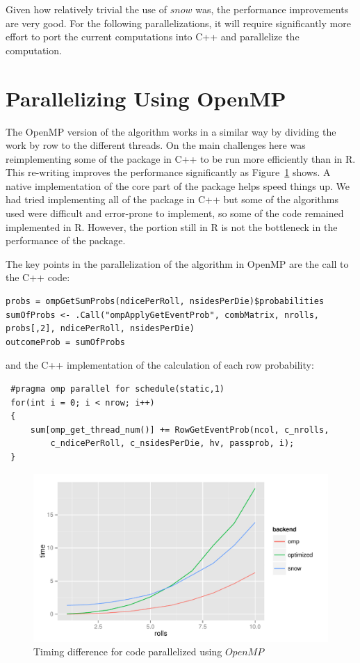 \documentclass[12pt]{article}
\begin{document}
Given how relatively trivial the use of $snow$ was, the performance improvements are very good. For the following parallelizations, it will require significantly more effort to port the current computations into C++ and parallelize the computation.

\section{Parallelizing Using OpenMP}

The OpenMP version of the algorithm works in a similar way by dividing the work by row to the different threads. On the main challenges here was reimplementing some of the package in C++ to be run more efficiently than in R. This re-writing improves the performance significantly as Figure~\ref{ompComparison} shows. A native implementation of the core part of the package helps speed things up. We had tried implementing all of the package in C++ but some of the algorithms used were difficult and error-prone to implement, so some of the code remained implemented in R. However, the portion still in R is not the bottleneck in the performance of the package.

The key points in the parallelization of the algorithm in OpenMP are the call to the C++ code:

\begin{lstlisting}
probs = ompGetSumProbs(ndicePerRoll, nsidesPerDie)$probabilities
sumOfProbs <- .Call("ompApplyGetEventProb", combMatrix, nrolls, probs[,2], ndicePerRoll, nsidesPerDie)
outcomeProb = sumOfProbs
\end{lstlisting}

and the C++ implementation of the calculation of each row probability:

\begin{lstlisting}
 #pragma omp parallel for schedule(static,1)	
 for(int i = 0; i < nrow; i++)
 {
	 sum[omp_get_thread_num()] += RowGetEventProb(ncol, c_nrolls, 
		 c_ndicePerRoll, c_nsidesPerDie, hv, passprob, i);
 }
\end{lstlisting}

\begin{figure}[h!]
	\centering
	\includegraphics[width=6in]{ompComparison.pdf}
	\caption{Timing difference for code parallelized using $OpenMP$}
	\label{ompComparison}
\end{figure}
\end{document}
